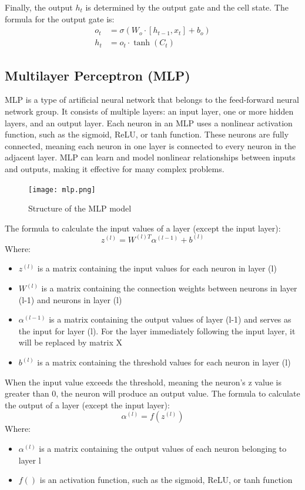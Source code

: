 \documentclass{ieeeojies}
\begin{document}
Finally, the output \( h_t \) is determined by the output gate and the cell state. The formula for the output gate is:
\begin{align*}
    o_t & = \sigma(W_o \cdot [h_{t-1}, x_t] + b_o) \\
    h_t & = o_t \cdot \tanh(C_t)
\end{align*}

\subsection{Multilayer Perceptron (MLP)}
MLP is a type of artificial neural network that belongs to the feed-forward neural network group. It consists of multiple layers: an input layer, one or more hidden layers, and an output layer. Each neuron in an MLP uses a nonlinear activation function, such as the sigmoid, ReLU, or tanh function. These neurons are fully connected, meaning each neuron in one layer is connected to every neuron in the adjacent layer. MLP can learn and model nonlinear relationships between inputs and outputs, making it effective for many complex problems. \cite{mlp}

\begin{figure}[H]
  \centering
  \begin{minipage}{0.8\linewidth}
    \centering
    \texttt{[image: mlp.png]}
    \caption{Structure of the MLP model \cite{mlp_image}}
    \label{fig_mlp}
  \end{minipage}
\end{figure}

The formula to calculate the input values of a layer (except the input layer):
\[ z^{(l)} = W^{(l) T}\alpha^{(l-1)} + b^{(l)} \]
Where:
    \begin{itemize}
        \item $z^{(l)}$ is a matrix containing the input values for each neuron in layer (l)
        \item $W^{(l)}$ is a matrix containing the connection weights between neurons in layer (l-1) and neurons in layer (l)
        \item $\alpha^{(l-1)}$ is a matrix containing the output values of layer (l-1) and serves as the input for layer (l). For the layer immediately following the input layer, it will be replaced by matrix X
        \item $b^{(l)}$ is a matrix containing the threshold values for each neuron in layer (l)
    \end{itemize}
        
When the input value exceeds the threshold, meaning the neuron's z value is greater than 0, the neuron will produce an output value. The formula to calculate the output of a layer (except the input layer):
\[ \alpha^{(l)} = f(z^{(l)}) \]
Where:
    \begin{itemize}
        \item $\alpha^{(l)}$ is a matrix containing the output values of each neuron belonging to layer l
        \item  $f()$ is an activation function, such as the sigmoid, ReLU, or tanh function
    \end{itemize}\\
    
\end{document}
